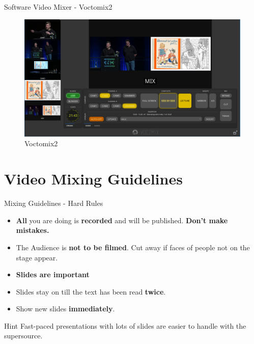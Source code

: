 \documentclass[aspectratio=169]{beamer}
\begin{document}
\begin{frame}{Software Video Mixer - Voctomix2}
	\begin{figure} 
		\centering
		\includegraphics[width=.9\textwidth]{images/voctomix2_3.png}
		\caption{Voctomix2}
	\end{figure}
\end{frame}




\section{Video Mixing Guidelines}
\begin{frame}{Mixing Guidelines - Hard Rules}
	\begin{itemize}
		\item \textbf{All} you are doing is \textbf{recorded} and will be published. \alert{\textbf{Don't make mistakes.}}
		\item The Audience is \textbf{not to be filmed}. Cut away if faces of people not on the stage appear.
		\item \textbf{Slides are important}
		\item Slides stay on till the text has been read \textbf{twice}.
		\item Show new slides \textbf{immediately}.
	\end{itemize}
	\begin{exampleblock}{Hint}
		Fast-paced presentations with lots of slides are easier to handle with the supersource.
	\end{exampleblock}
\end{frame}
\end{document}
